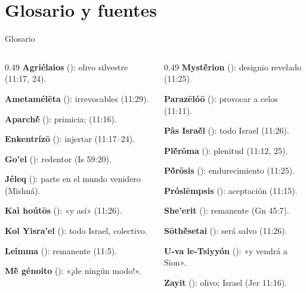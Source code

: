\section{Glosario y fuentes}
\begin{frame}{Glosario}
\begin{columns}[T,onlytextwidth]
\begin{column}{0.49\textwidth}\scriptsize
\textbf{Agriélaios} (): olivo silvestre (11:17, 24).\par\smallskip
\textbf{Ametamélēta} (): irrevocables (11:29).\par\smallskip
\textbf{Aparchḗ} (): primicia;  (11:16).\par\smallskip
\textbf{Enkentrízō} (): injertar (11:17--24).\par\smallskip
\textbf{Go'el} (): redentor (Is 59:20).\par\smallskip
\textbf{Jéleq} (): parte en el mundo venidero (Mishná).\par\smallskip
\textbf{Kaì hoútōs} (): «y así» (11:26).\par\smallskip
\textbf{Kol Yisra'el} (): todo Israel, colectivo.\par\smallskip
\textbf{Leîmma} (): remanente (11:5).\par\smallskip
\textbf{Mḕ génoito} (): «¡de ningún modo!».
\end{column}
\begin{column}{0.49\textwidth}\scriptsize
\textbf{Mystḗrion} (): designio revelado (11:25).\par\smallskip
\textbf{Parazēlóō} (): provocar a celos (11:11).\par\smallskip
\textbf{Pâs Israḗl} (): todo Israel (11:26).\par\smallskip
\textbf{Plḗrōma} (): plenitud (11:12, 25).\par\smallskip
\textbf{Pṓrōsis} (): endurecimiento (11:25).\par\smallskip
\textbf{Próslēmpsis} (): aceptación (11:15).\par\smallskip
\textbf{She'erit} (): remanente (Gn 45:7).\par\smallskip
\textbf{Sōthḗsetai} (): será salvo (11:26).\par\smallskip
\textbf{U-va le-Tsiyyón} (): «y vendrá a Sion».\par\smallskip
\textbf{Zayit} (): olivo; Israel (Jer 11:16).
\end{column}
\end{columns}
\end{frame}

